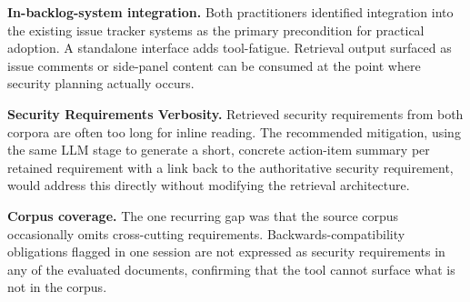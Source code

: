 \textbf{In-backlog-system integration.}
Both practitioners identified integration into the existing issue tracker systems as the primary precondition for practical adoption.
A standalone interface adds tool-fatigue. Retrieval output surfaced as issue comments or side-panel content can be consumed at the point where security planning actually occurs.

\textbf{Security Requirements Verbosity.}
Retrieved security requirements from both corpora are often too long for inline reading.
The recommended mitigation, using the same LLM stage to generate a short, concrete action-item summary per retained requirement with a link back to the authoritative security requirement, would address this directly without modifying the retrieval architecture.

\textbf{Corpus coverage.}
The one recurring gap was that the source corpus occasionally omits cross-cutting requirements.
Backwards-compatibility obligations flagged in one session are not expressed as security requirements in any of the evaluated documents, confirming that the tool cannot surface what is not in the corpus.
